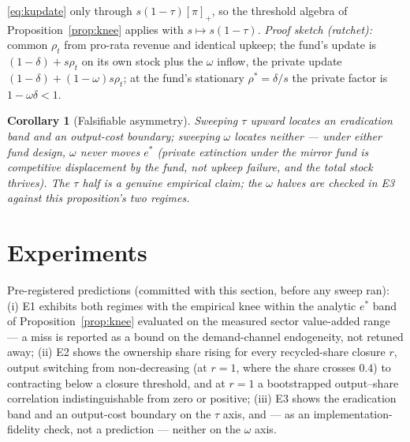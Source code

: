 \documentclass[11pt]{article}
\newtheorem{corollary}{Corollary}
\newcommand{\relu}[1]{\left[#1\right]_+}
\begin{document}
\eqref{eq:kupdate} only through $s(1-\tau)\relu{\pi}$, so the threshold
algebra of Proposition~\ref{prop:knee} applies with $s \mapsto s(1-\tau)$.
\emph{Proof sketch (ratchet):} common $\rho_t$ from pro-rata revenue and
identical upkeep; the fund's update is $(1-\delta) + s\rho_t$ on its own
stock plus the $\omega$ inflow, the private update
$(1-\delta) + (1-\omega)s\rho_t$; at the fund's stationary $\rho^{*} =
\delta/s$ the private factor is $1 - \omega\delta < 1$.
\begin{corollary}[Falsifiable asymmetry]\label{cor:boundary}
Sweeping $\tau$ upward locates an eradication band and an output-cost
boundary; sweeping $\omega$ locates neither --- under either fund design,
$\omega$ never moves $e^{*}$ (private extinction under the mirror fund is
competitive displacement by the fund, not upkeep failure, and the
\emph{total} stock thrives). The $\tau$ half is a genuine empirical claim;
the $\omega$ halves are checked in E3 against this proposition's two
regimes.
\end{corollary}

\section{Experiments}\label{sec:experiments}

Pre-registered predictions (committed with this section, before any sweep
ran): (i) E1 exhibits both regimes with the empirical knee within the
analytic $e^{*}$ band of Proposition~\ref{prop:knee} evaluated on the
measured sector value-added range --- a miss is reported as a bound on the
demand-channel endogeneity, not retuned away; (ii) E2 shows the ownership
share rising for every recycled-share closure $r$, output switching from
non-decreasing (at $r=1$, where the share crosses $0.4$) to contracting
below a closure threshold, and at $r=1$ a bootstrapped output--share
correlation indistinguishable from zero or positive; (iii) E3 shows the
eradication band and an output-cost boundary on the $\tau$ axis, and ---
as an implementation-fidelity check, not a prediction --- neither on the
$\omega$ axis.
\end{document}
